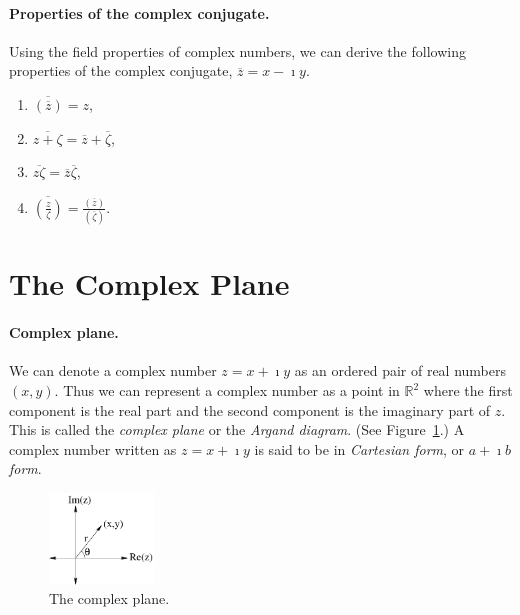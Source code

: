 \paragraph{Properties of the complex conjugate.} 
Using the field properties of complex numbers, we can derive 
the following properties of the complex conjugate, 
$\overline{z} = x - \imath y$.
\begin{enumerate}
\item
  $\displaystyle \overline{\left( \overline{z} \right)} = z$, 
\item
  $\displaystyle \overline{z + \zeta} = \overline{z} + \overline{\zeta}$, 
\item
  $\displaystyle \overline{z \zeta} = \overline{z} \overline{\zeta}$, 
\item
  $\displaystyle \overline{ \left( \frac{z}{\zeta} \right) } 
  = \frac{ \left( \overline{z} \right) }{ \left( \overline{\zeta} \right) }$. 
\end{enumerate}











\section{The Complex Plane}





\paragraph{Complex plane.}
We can denote a complex number $z = x + \imath y$ as an ordered pair of real
numbers $(x,y)$.  Thus we can represent a complex number as a point in 
$\mathbb{R}^2$ where the first component is the real part and the second 
component is the imaginary part of $z$.  This is called the 
\textit{complex plane} 
or the \textit{Argand diagram}.  (See Figure~\ref{complexplane}.)
A complex number written as $z = x + \imath y$ is said to be in 
\textit{Cartesian form}, or \textit{$a + \imath b$ form}.

\begin{figure}[h!]
  \begin{center}
    \includegraphics[width=0.25\textwidth]{fcv/number/comp_pln}
  \end{center}
  \caption{The complex plane.}
  \label{complexplane}
\end{figure}


